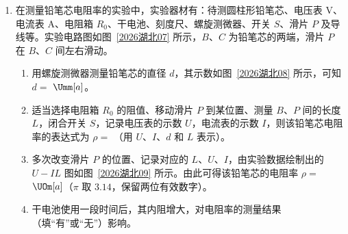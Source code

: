 \documentclass[\gkver]{gaokaozhenti}
\begin{document}
\begin{enumerate}
\item
在测量铅笔芯电阻率的实验中，实验器材有：待测圆柱形铅笔芯、电压表 $ \mathrm{V} $、电流表 $ \mathrm{A} $、电阻箱 $ R_{0} $、干电池、刻度尺、螺旋测微器、开关 $ S $、滑片 $ P $ 及导线等。实验电路图如图~\ref{2026湖北07} 所示，$ B $、$ C $ 为铅笔芯的两端，滑片 $ P $ 在 $ B $、$ C $ 间左右滑动。
\twopicture[labelA=2026湖北07, labelB=2026湖北08, wA=6.85cm, hA=5.62cm, wB=3.43cm, hB=5.32cm]
{}{}
\begin{enumerate}
\item
用螺旋测微器测量铅笔芯的直径 $d$，其示数如图~\ref{2026湖北08} 所示，可知 $d=$  $\Umm[a]$。
\item
适当选择电阻箱 $ R_{0} $ 的阻值、移动滑片 $ P $ 到某位置、测量 $ B $、$ P $ 间的长度 $ L $，闭合开关 $ S $，记录电压表的示数 $ U $，电流表的示数 $ I $，则该铅笔芯电阻率的表达式为 $ \rho = $ （用 $ U $、$ I $、$ d $ 和 $ L $ 表示）。
\item
多次改变滑片 $ P $ 的位置、记录对应的 $ L $、$ U $、$ I $，由实验数据绘制出的 $ U-IL $ 图如图~\ref{2026湖北09} 所示。由此可得该铅笔芯的电阻率 $ \rho = $  $ \UOm[a] $（$ \pi $ 取 $ 3.14 $，保留两位有效数字）。
\onepicture[num=c, showlabel=false, label=2026湖北09, w=11.07cm, h=8.07cm]{}
\item
干电池使用一段时间后，其内阻增大，对电阻率的测量结果（填“有”或“无”）影响。	
\end{enumerate}



\end{enumerate}
\end{document}
